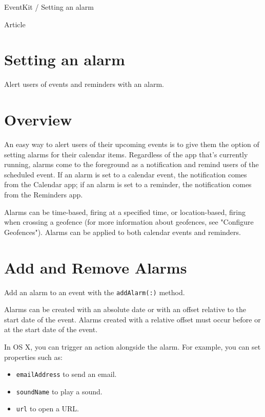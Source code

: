 \documentclass{article}
\title{}
\author{}
\date{}
\begin{document}
EventKit / Setting an alarm

Article

\section*{Setting an alarm}
Alert users of events and reminders with an alarm.

\section*{Overview}
An easy way to alert users of their upcoming events is to give them the option of setting alarms for their calendar
items. Regardless of the app that's currently running, alarms come to the foreground as a notification and remind
users of the scheduled event. If an alarm is set to a calendar event, the notification comes from the Calendar app;
if an alarm is set to a reminder, the notification comes from the Reminders app.

Alarms can be time-based, firing at a specified time, or location-based, firing when crossing a geofence (for more
information about geofences, see "Configure Geofences"). Alarms can be applied to both calendar events
and reminders.

\noindent{}

\section*{Add and Remove Alarms}
Add an alarm to an event with the \texttt{addAlarm(:)} method.

Alarms can be created with an absolute date or with an offset relative to the start date of the event. Alarms
created with a relative offset must occur before or at the start date of the event.

In OS X, you can trigger an action alongside the alarm. For example, you can set properties such as:
\begin{itemize}
    \item \texttt{emailAddress} to send an email.
    \item \texttt{soundName} to play a sound.
    \item \texttt{url} to open a URL.
\end{itemize}
\end{document}

